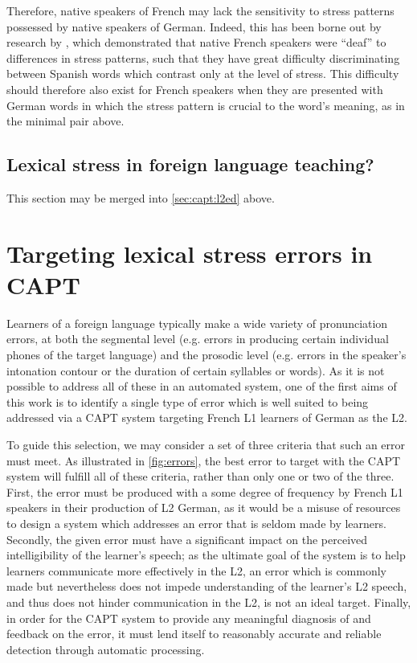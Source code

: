 		Therefore, native speakers of French may lack the sensitivity to stress patterns possessed by native speakers of German. Indeed, this has been borne out by research by \citeauthor{Dupoux2008} \citep{Peperkamp2002,Dupoux2001,Dupoux2008}, which demonstrated that native French speakers were ``deaf'' to differences in stress patterns, such that they have great difficulty discriminating between Spanish words which contrast only at the level of stress. This difficulty should therefore also exist for French speakers when they are presented with German words in which the stress pattern is crucial to the word's meaning, as in the minimal pair above.
		
		\subsection{Lexical stress in foreign language teaching?}
		\label{sec:stress:l2ed}
		
		This section may be merged into \cref{sec:capt:l2ed} above.
		
		\citep{Hirschfeld2007}
		
		
 \section{Targeting lexical stress errors in CAPT}
 \label{sec:bkgd:targeting}
 	Learners of a foreign language typically make a wide variety of pronunciation errors, at both the segmental level (e.g. errors in producing certain individual phones of the target language) and the prosodic level (e.g. errors in the speaker's intonation contour or the duration of certain syllables or words). As it is not possible to address all of these in an automated system, one of the first aims of this work is to identify a single type of error which is well suited to being addressed via a CAPT system targeting French L1 learners of German as the L2. 
	
	To guide this selection, we may consider %
a set of three criteria that such an error must meet. 
As illustrated in \cref{fig:errors}, the best error to target with the CAPT system will fulfill all of these criteria, rather than only one or two of the three. 
First, the error must be produced with a some degree of frequency by French L1 speakers in their production of L2 German, as it would be a misuse of resources to design a system which addresses an error that is seldom made by learners. Secondly, the given error must have a significant impact on the perceived intelligibility of the learner's speech; as the ultimate goal of the system is to help learners communicate more effectively in the L2, an error which is commonly made but nevertheless does not impede understanding of the learner's L2 speech, and thus does not hinder communication in the L2, is not an ideal target. Finally, in order for the CAPT system to provide any meaningful diagnosis of and feedback on the error, it must lend itself to reasonably accurate and reliable  detection through automatic processing. 
	
